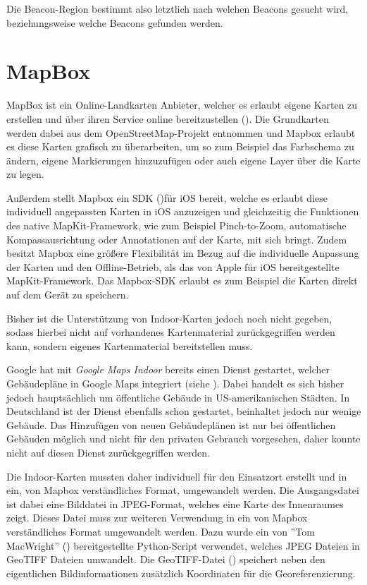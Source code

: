 Die Beacon-Region bestimmt also letztlich nach welchen Beacons gesucht wird, beziehungsweise welche Beacons gefunden werden.

\section{MapBox}
\label{sec:sec:technologies:mapbox}
MapBox ist ein Online-Landkarten Anbieter, welcher es erlaubt eigene Karten zu erstellen und über ihren Service online bereitzustellen (\citet{mapboxweb}). 
Die Grundkarten werden dabei aus dem OpenStreetMap-Projekt entnommen und Mapbox erlaubt es diese Karten grafisch zu überarbeiten, um so zum Beispiel das Farbschema zu ändern, eigene Markierungen hinzuzufügen oder auch eigene Layer über die Karte zu legen.

Außerdem stellt Mapbox ein SDK (\citet{mapboxsdk})für iOS bereit, welche es erlaubt diese individuell angepassten Karten in iOS anzuzeigen und gleichzeitig die Funktionen des native MapKit-Framework, wie zum Beispiel Pinch-to-Zoom, automatische Kompassausrichtung oder Annotationen auf der Karte, mit sich bringt. Zudem besitzt Mapbox eine größere Flexibilität im Bezug auf die individuelle Anpassung der Karten und den Offline-Betrieb, als das von Apple für iOS bereitgestellte MapKit-Framework. Das Mapbox-SDK erlaubt es zum Beispiel die Karten direkt auf dem Gerät zu speichern.

Bisher ist die Unterstützung von Indoor-Karten jedoch noch nicht gegeben, sodass hierbei nicht auf vorhandenes Kartenmaterial zurückgegriffen werden kann, sondern eigenes Kartenmaterial bereitstellen muss.

Google hat mit \emph{Google Maps Indoor} bereits einen Dienst gestartet, welcher Gebäudepläne in Google Maps integriert (siehe \citet{googleindoormaps}). Dabei handelt es sich bisher jedoch hauptsächlich um öffentliche Gebäude in US-amerikanischen Städten. In Deutschland ist der Dienst ebenfalls schon gestartet, beinhaltet jedoch nur wenige Gebäude. Das Hinzufügen von neuen Gebäudeplänen ist nur bei öffentlichen Gebäuden möglich und nicht für den privaten Gebrauch vorgesehen, daher konnte nicht auf diesen Dienst zurückgegriffen werden.

Die Indoor-Karten mussten daher individuell für den Einsatzort erstellt und in ein, von Mapbox verständliches Format, umgewandelt werden.
Die Ausgangsdatei ist dabei eine Bilddatei in JPEG-Format, welches eine Karte des Innenraumes zeigt. Dieses Datei muss zur weiteren Verwendung in ein von Mapbox verständliches Format umgewandelt werden. 
Dazu wurde ein von ''Tom MacWright'' (\citet{jpgtogeo}) bereitgestellte Python-Script verwendet, welches JPEG Dateien in GeoTIFF Dateien umwandelt. Die GeoTIFF-Datei (\citet{geotiff}) speichert neben den eigentlichen Bildinformationen zusätzlich Koordinaten für die Georeferenzierung. 

